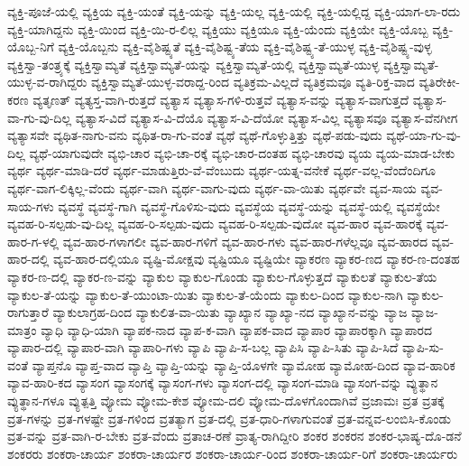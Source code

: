 ವ್ಯಕ್ತಿ-ಪೂಜೆ-ಯಲ್ಲಿ
ವ್ಯಕ್ತಿಯ
ವ್ಯಕ್ತಿ-ಯಂತೆ
ವ್ಯಕ್ತಿ-ಯನ್ನು
ವ್ಯಕ್ತಿ-ಯಲ್ಲ
ವ್ಯಕ್ತಿ-ಯಲ್ಲಿ
ವ್ಯಕ್ತಿ-ಯಲ್ಲಿದ್ದ
ವ್ಯಕ್ತಿ-ಯಾಗ-ಲಾ-ರದು
ವ್ಯಕ್ತಿ-ಯಾಗಿದ್ದನು
ವ್ಯಕ್ತಿ-ಯಿಂದ
ವ್ಯಕ್ತಿ-ಯಿ-ರ-ಲಿಲ್ಲ
ವ್ಯಕ್ತಿಯು
ವ್ಯಕ್ತಿಯೂ
ವ್ಯಕ್ತಿ-ಯೆಂದು
ವ್ಯಕ್ತಿಯೇ
ವ್ಯಕ್ತಿ-ಯೊಬ್ಬ
ವ್ಯಕ್ತಿ-ಯೊಬ್ಬ-ನಿಗೆ
ವ್ಯಕ್ತಿ-ಯೊಬ್ಬನು
ವ್ಯಕ್ತಿ-ವೈಶಿಷ್ಟ್ಯತೆ
ವ್ಯಕ್ತಿ-ವೈಶಿಷ್ಟ್ಯ-ತೆಯ
ವ್ಯಕ್ತಿ-ವೈಶಿಷ್ಟ್ಯ-ತೆ-ಯುಳ್ಳ
ವ್ಯಕ್ತಿ-ವೈಶಿಷ್ಟ್ಯ-ವುಳ್ಳ
ವ್ಯಕ್ತಿಸ್ವಾ-ತಂತ್ರ್ಯಕ್ಕೆ
ವ್ಯಕ್ತಿಸ್ವಾಮ್ಯತೆ
ವ್ಯಕ್ತಿಸ್ವಾಮ್ಯತೆ-ಯನ್ನು
ವ್ಯಕ್ತಿಸ್ವಾಮ್ಯತೆ-ಯಲ್ಲಿ
ವ್ಯಕ್ತಿಸ್ವಾಮ್ಯತೆ-ಯುಳ್ಳ
ವ್ಯಕ್ತಿಸ್ವಾಮ್ಯತೆ-ಯುಳ್ಳ-ವ-ರಾಗಿದ್ದರು
ವ್ಯಕ್ತಿಸ್ವಾಮ್ಯತೆ-ಯುಳ್ಳ-ವರಾದ್ದ-ರಿಂದ
ವ್ಯತಿಕ್ರಮ-ವಿಲ್ಲದೆ
ವ್ಯತಿಕ್ರಮವೂ
ವ್ಯತಿ-ರಿಕ್ತ-ವಾದ
ವ್ಯತಿರೇಕೀ-ಕರಣ
ವ್ಯತೃಣತ್
ವ್ಯತ್ಯಸ್ತ-ವಾಗಿ-ರುತ್ತದೆ
ವ್ಯತ್ಯಾಸ
ವ್ಯತ್ಯಾಸ-ಗಳಿ-ರುತ್ತವೆ
ವ್ಯತ್ಯಾಸ-ವನ್ನು
ವ್ಯತ್ಯಾಸ-ವಾಗುತ್ತದೆ
ವ್ಯತ್ಯಾಸ-ವಾ-ಗು-ವು-ದಿಲ್ಲ
ವ್ಯತ್ಯಾಸ-ವಿದೆ
ವ್ಯತ್ಯಾಸ-ವಿ-ದೆಯೊ
ವ್ಯತ್ಯಾಸ-ವಿ-ದೆಯೋ
ವ್ಯತ್ಯಾಸ-ವಿಲ್ಲ
ವ್ಯತ್ಯಾಸವೂ
ವ್ಯತ್ಯಾಸ-ವೆನಗೀಗ
ವ್ಯತ್ಯಾಸವೇ
ವ್ಯಥಿತ-ನಾಗು-ವನು
ವ್ಯಥಿತ-ರಾ-ಗು-ವಂತೆ
ವ್ಯಥೆ
ವ್ಯಥೆ-ಗೊಳ್ಳುತ್ತಿತ್ತು
ವ್ಯಥೆ-ಪಡು-ವುದು
ವ್ಯಥೆ-ಯಾ-ಗು-ವು-ದಿಲ್ಲ
ವ್ಯಥೆ-ಯಾಗುವುದೇ
ವ್ಯಭಿ-ಚಾರ
ವ್ಯಭಿ-ಚಾ-ರಕ್ಕೆ
ವ್ಯಭಿ-ಚಾರ-ದಂತಹ
ವ್ಯಭಿ-ಚಾರವು
ವ್ಯಯ
ವ್ಯಯ-ಮಾಡ-ಬೇಕು
ವ್ಯರ್ಥ
ವ್ಯರ್ಥ-ಮಾಡಿ-ದರೆ
ವ್ಯರ್ಥ-ಮಾಡುತ್ತಿರು-ವೆ-ವೆಂಬುದು
ವ್ಯರ್ಥ-ಯತ್ನ-ವನೇಕೆ
ವ್ಯರ್ಥ-ವಲ್ಲ-ವೆಂದೆಂದಿಗೂ
ವ್ಯರ್ಥ-ವಾಗ-ಲಿಕ್ಕಿಲ್ಲ-ವೆಂದು
ವ್ಯರ್ಥ-ವಾಗಿ
ವ್ಯರ್ಥ-ವಾಗು-ವುದು
ವ್ಯರ್ಥ-ವಾ-ಯಿತು
ವ್ಯರ್ಥವೇ
ವ್ಯವ-ಸಾಯ
ವ್ಯವ-ಸಾಯ-ಗಳು
ವ್ಯವಸ್ಥೆ
ವ್ಯವಸ್ಥೆ-ಗಾಗಿ
ವ್ಯವಸ್ಥೆ-ಗೊಳಿಸು-ವುದು
ವ್ಯವಸ್ಥೆಯ
ವ್ಯವಸ್ಥೆ-ಯನ್ನು
ವ್ಯವಸ್ಥೆ-ಯಲ್ಲಿ
ವ್ಯವಸ್ಥೆಯೇ
ವ್ಯವಹ-ರಿ-ಸಲ್ಪಡು-ವು-ದಿಲ್ಲ
ವ್ಯವಹ-ರಿ-ಸಲ್ಪಡು-ವುದು
ವ್ಯವಹ-ರಿ-ಸಲ್ಪಡು-ವುದೋ
ವ್ಯವ-ಹಾರ
ವ್ಯವ-ಹಾರಕ್ಕೆ
ವ್ಯವ-ಹಾರ-ಗ-ಳಲ್ಲಿ
ವ್ಯವ-ಹಾರ-ಗಳಾಗಲೀ
ವ್ಯವ-ಹಾರ-ಗಳಿಗೆ
ವ್ಯವ-ಹಾರ-ಗಳು
ವ್ಯವ-ಹಾರ-ಗಳೆಲ್ಲವೂ
ವ್ಯವ-ಹಾರದ
ವ್ಯವ-ಹಾರ-ದಲ್ಲಿ
ವ್ಯವ-ಹಾರ-ದಲ್ಲಿಯೂ
ವ್ಯಷ್ಟಿ-ಮೋಕ್ಷವು
ವ್ಯಷ್ಟಿಯೂ
ವ್ಯಷ್ಟಿಯೇ
ವ್ಯಾಕರಣ
ವ್ಯಾಕರ-ಣದ
ವ್ಯಾಕರ-ಣ-ದಂತಹ
ವ್ಯಾಕರ-ಣ-ದಲ್ಲಿ
ವ್ಯಾಕರ-ಣ-ವನ್ನು
ವ್ಯಾಕುಲ
ವ್ಯಾಕುಲ-ಗೊಂಡು
ವ್ಯಾಕುಲ-ಗೊಳ್ಳುತ್ತದೆ
ವ್ಯಾಕುಲತೆ
ವ್ಯಾಕುಲ-ತೆಯ
ವ್ಯಾಕುಲ-ತೆ-ಯನ್ನು
ವ್ಯಾಕುಲ-ತೆ-ಯುಂಟಾ-ಯಿತು
ವ್ಯಾಕುಲ-ತೆ-ಯೆಂದು
ವ್ಯಾಕುಲ-ದಿಂದ
ವ್ಯಾಕುಲ-ನಾಗಿ
ವ್ಯಾಕುಲ-ರಾಗುತ್ತಾರೆ
ವ್ಯಾಕುಲಾಗ್ರಹ-ದಿಂದ
ವ್ಯಾಕುಲಿತ-ವಾ-ಯಿತು
ವ್ಯಾಖ್ಯಾನ
ವ್ಯಾಖ್ಯಾ-ನದ
ವ್ಯಾಖ್ಯಾನ-ವನ್ನು
ವ್ಯಾಜ
ವ್ಯಾಜ-ಮಾತ್ರಂ
ವ್ಯಾಧಿ
ವ್ಯಾಧಿ-ಯಾಗಿ
ವ್ಯಾಪಕ-ನಾದ
ವ್ಯಾಪ-ಕ-ವಾಗಿ
ವ್ಯಾಪಕ-ವಾದ
ವ್ಯಾಪಾರ
ವ್ಯಾಪಾರಕ್ಕಾಗಿ
ವ್ಯಾಪಾರದ
ವ್ಯಾಪಾರ-ದಲ್ಲಿ
ವ್ಯಾಪಾರ-ವಾಗಿ
ವ್ಯಾಪಾರಿ-ಗಳು
ವ್ಯಾಪಿ
ವ್ಯಾಪಿ-ಸ-ಬಲ್ಲ
ವ್ಯಾಪಿಸಿ
ವ್ಯಾಪಿ-ಸಿತು
ವ್ಯಾಪಿ-ಸಿದೆ
ವ್ಯಾಪಿ-ಸು-ವಂತೆ
ವ್ಯಾಪ್ತನೊ
ವ್ಯಾಪ್ತ-ವಾದ
ವ್ಯಾಪ್ತಿ
ವ್ಯಾಪ್ತಿ-ಯನ್ನು
ವ್ಯಾಪ್ತಿ-ಯೊಳಗೇ
ವ್ಯಾಮೋಹ
ವ್ಯಾಮೋಹ-ದಿಂದ
ವ್ಯಾವ-ಹಾರಿಕ
ವ್ಯಾವ-ಹಾರಿ-ಕದ
ವ್ಯಾಸಂಗ
ವ್ಯಾಸಂಗಕ್ಕೆ
ವ್ಯಾಸಂಗ-ಗಳು
ವ್ಯಾಸಂಗ-ದಲ್ಲಿ
ವ್ಯಾಸಂಗ-ಮಾಡಿ
ವ್ಯಾಸಂಗ-ವನ್ನು
ವ್ಯುತ್ಥಾನ
ವ್ಯುತ್ಥಾನ-ಗಳೂ
ವ್ಯುತ್ಪತ್ತಿ
ವ್ಯೋಮ
ವ್ಯೋಮ-ಕೇಶ
ವ್ಯೋಮ-ದಲಿ
ವ್ಯೋಮ-ದೊಳಗೊಂದಾಗಿವೆ
ವ್ರಜಾಮಃ
ವ್ರತ
ವ್ರತಕ್ಕೆ
ವ್ರತ-ಗಳನ್ನು
ವ್ರತ-ಗಳಷ್ಟೇ
ವ್ರತ-ಗಳಿಂದ
ವ್ರತತ್ಯಾಗ
ವ್ರತ-ದಲ್ಲಿ
ವ್ರತ-ಧಾರಿ-ಗಳಾಗುವಂತೆ
ವ್ರತ-ವನ್ನವ-ಲಂಬಿಸಿ-ಕೊಂಡು
ವ್ರತ-ವನ್ನು
ವ್ರತ-ವಾಗಿ-ರ-ಬೇಕು
ವ್ರತ-ವೆಂದು
ವ್ರತಾಚ-ರಣೆ
ವ್ರಾತ್ಯ-ರಾಗಿದ್ದೀರಿ
ಶಂಕರ
ಶಂಕರನ
ಶಂಕರ-ಭಾಷ್ಯ-ದೊ-ಡನೆ
ಶಂಕರರು
ಶಂಕರಾ-ಚಾರ್ಯ
ಶಂಕರಾ-ಚಾರ್ಯರ
ಶಂಕರಾ-ಚಾರ್ಯ-ರಿಂದ
ಶಂಕರಾ-ಚಾರ್ಯ-ರಿಗೆ
ಶಂಕರಾ-ಚಾರ್ಯರು
